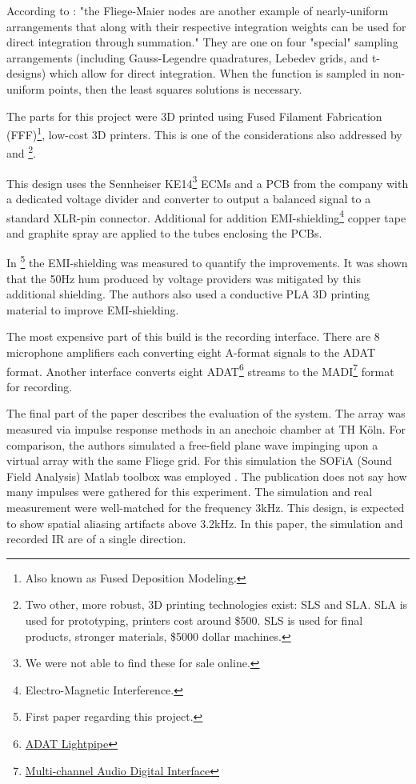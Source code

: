 According to \cite{SPHERICA45online}: "the Fliege-Maier nodes are another example of nearly-uniform arrangements that along with their respective integration weights can be used for direct integration through summation." They are one on four "special" sampling arrangements (including Gauss-Legendre quadratures, Lebedev grids, and t-designs) which allow for direct integration. When the function is sampled in non-uniform points, then the least squares solutions is necessary.

The parts for this project were 3D printed using Fused Filament Fabrication (FFF)\footnote{Also known as Fused Deposition Modeling.}, low-cost 3D printers. This is one of the considerations also addressed by \cite{lopez2019sphear} and \cite{gonzalez2018modular}\footnote{Two other, more robust, 3D printing technologies exist: SLS and SLA. SLA is used for prototyping, printers cost around \$500. SLS is used for final products, stronger materials, \$5000 dollar machines.}. 

This design uses the Sennheiser KE14\footnote{We were not able to find these for sale online.} ECMs and a PCB from the company with a dedicated voltage divider and converter to output a balanced signal to a standard XLR-pin connector. Additional for addition EMI-shielding\footnote{Electro-Magnetic Interference.} copper tape and graphite spray are applied to the tubes enclosing the PCBs. 

In \cite{dziwis2019development}\footnote{First paper regarding this project.} the EMI-shielding was measured to quantify the improvements. It was shown that the 50Hz hum produced by voltage providers was mitigated by this additional shielding. The authors also used a conductive PLA 3D printing material to improve EMI-shielding. 


The most expensive part of this build is the recording interface. There are 8 microphone amplifiers each converting eight A-format signals to the ADAT format. Another interface converts eight ADAT\footnote{\href{https://en.wikipedia.org/wiki/ADAT_Lightpipe}{ADAT Lightpipe}} streams to the MADI\footnote{\href{https://en.wikipedia.org/wiki/MADI}{Multi-channel Audio Digital Interface}} format for recording. 

The final part of the paper describes the evaluation of the system. The array was measured via impulse response methods in an anechoic chamber at TH Köln. For comparison, the authors simulated a free-field plane wave impinging upon a virtual array with the same Fliege grid. For this simulation the SOFiA (Sound Field Analysis) Matlab toolbox was employed \cite{bernschutz2011sofia}. The publication does not say how many impulses were gathered for this experiment. The simulation and real measurement were well-matched for the frequency 3kHz. This design, is expected to show spatial aliasing artifacts above 3.2kHz. In this paper, the simulation and recorded IR are of a single direction. 

